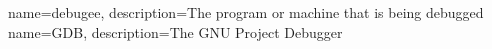 {
    name=debugee,
    description={The program or machine that is being debugged}
}
{
    name=GDB,
    description={The GNU Project Debugger}
}



